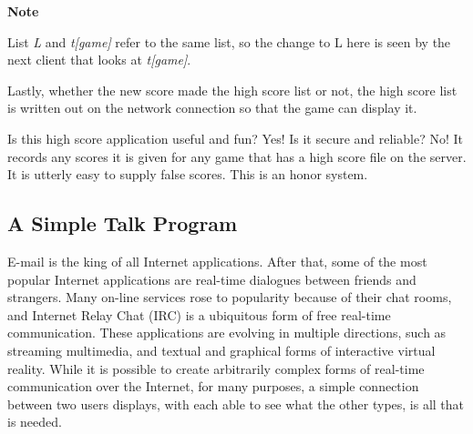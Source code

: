 
{\sffamily\bfseries
Note}

{\sffamily
List \textit{L} and \textit{t[game]} refer to the same list, so the
change to L here is seen by the next client that looks at
\textit{t[game]}.}

Lastly, whether the new score made the high score list or not, the high
score list is written out on the network connection so that the game
can display it.


Is this high score application useful and fun? Yes! Is it secure and
reliable? No! It records any scores it is given for any game that has a
high score file on the server. It is utterly easy to supply false
scores. This is an honor system.

\subsection{A Simple {\textquotedbl}Talk{\textquotedbl} Program}
E-mail is the king of all Internet applications. After that, some of the
most popular Internet applications are real-time dialogues between
friends and strangers. Many on-line services rose to popularity because
of their {\textquotedbl}chat rooms,{\textquotedbl} and Internet Relay
Chat (IRC) is a ubiquitous form of free real-time
communication. These applications are evolving in multiple directions,
such as streaming multimedia, and textual and graphical forms of
interactive virtual reality. While it is possible to create arbitrarily
complex forms of real-time communication over the Internet, for many
purposes, a simple connection between two users{\textquotesingle}
displays, with each able to see what the other types, is all that is
needed.

